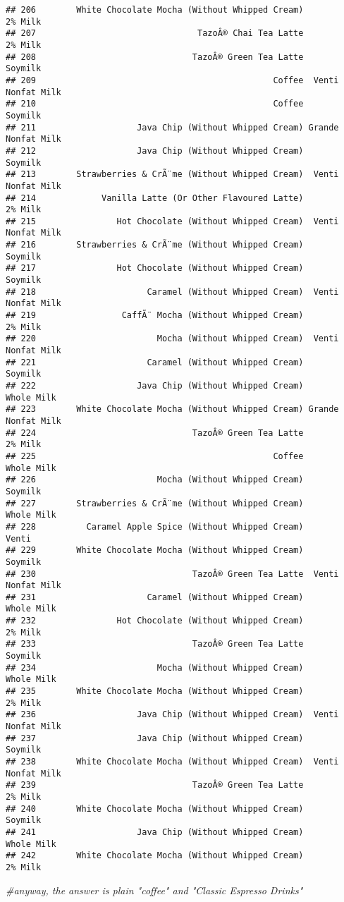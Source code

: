 \documentclass[
]{article}
\newenvironment{Shaded}{\begin{snugshade}}{\end{snugshade}}
\newcommand{\CommentTok}[1]{\textcolor[rgb]{0.56,0.35,0.01}{\textit{#1}}}
\begin{document}
\begin{verbatim}
## 206        White Chocolate Mocha (Without Whipped Cream)            2% Milk
## 207                                TazoÂ® Chai Tea Latte            2% Milk
## 208                               TazoÂ® Green Tea Latte            Soymilk
## 209                                               Coffee  Venti Nonfat Milk
## 210                                               Coffee            Soymilk
## 211                    Java Chip (Without Whipped Cream) Grande Nonfat Milk
## 212                    Java Chip (Without Whipped Cream)            Soymilk
## 213        Strawberries & CrÃ¨me (Without Whipped Cream)  Venti Nonfat Milk
## 214             Vanilla Latte (Or Other Flavoured Latte)            2% Milk
## 215                Hot Chocolate (Without Whipped Cream)  Venti Nonfat Milk
## 216        Strawberries & CrÃ¨me (Without Whipped Cream)            Soymilk
## 217                Hot Chocolate (Without Whipped Cream)            Soymilk
## 218                      Caramel (Without Whipped Cream)  Venti Nonfat Milk
## 219                 CaffÃ¨ Mocha (Without Whipped Cream)            2% Milk
## 220                        Mocha (Without Whipped Cream)  Venti Nonfat Milk
## 221                      Caramel (Without Whipped Cream)            Soymilk
## 222                    Java Chip (Without Whipped Cream)         Whole Milk
## 223        White Chocolate Mocha (Without Whipped Cream) Grande Nonfat Milk
## 224                               TazoÂ® Green Tea Latte            2% Milk
## 225                                               Coffee         Whole Milk
## 226                        Mocha (Without Whipped Cream)            Soymilk
## 227        Strawberries & CrÃ¨me (Without Whipped Cream)         Whole Milk
## 228          Caramel Apple Spice (Without Whipped Cream)              Venti
## 229        White Chocolate Mocha (Without Whipped Cream)            Soymilk
## 230                               TazoÂ® Green Tea Latte  Venti Nonfat Milk
## 231                      Caramel (Without Whipped Cream)         Whole Milk
## 232                Hot Chocolate (Without Whipped Cream)            2% Milk
## 233                               TazoÂ® Green Tea Latte            Soymilk
## 234                        Mocha (Without Whipped Cream)         Whole Milk
## 235        White Chocolate Mocha (Without Whipped Cream)            2% Milk
## 236                    Java Chip (Without Whipped Cream)  Venti Nonfat Milk
## 237                    Java Chip (Without Whipped Cream)            Soymilk
## 238        White Chocolate Mocha (Without Whipped Cream)  Venti Nonfat Milk
## 239                               TazoÂ® Green Tea Latte            2% Milk
## 240        White Chocolate Mocha (Without Whipped Cream)            Soymilk
## 241                    Java Chip (Without Whipped Cream)         Whole Milk
## 242        White Chocolate Mocha (Without Whipped Cream)            2% Milk
\end{verbatim}

\begin{Shaded}
\begin{Highlighting}[]
\CommentTok{\#anyway, the answer is plain "coffee" and "Classic Espresso Drinks"}
\end{Highlighting}
\end{Shaded}
\end{document}
